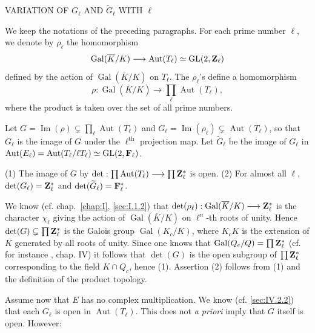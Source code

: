 %
  {VARIATION OF $G_\ell$ AND $\widetilde{G}_\ell$ WITH $\ell$}


We keep the notations of the preceding paragraphs. For each prime number $\ell$, we denote by $\rho_\ell$ the homomorphism
\[
  \operatorname{Gal}(\overline{K}/K) \longrightarrow \operatorname{Aut}(T_\ell) \simeq \mathrm{GL}(2,\mathbf{Z}_\ell)
\]
defined by the action of $\operatorname{Gal}(\overline{K}/K)$ on $T_\ell$. The $\rho_\ell$'s define a homomorphism
\[
  \rho : \operatorname{Gal}(\overline{K}/K) \longrightarrow \prod_{\ell} \operatorname{Aut}(T_\ell),
\]
where the product is taken over the set of all prime numbers.

Let $G = \operatorname{Im}(\rho) \subsetneq \prod_{\ell} \operatorname{Aut}(T_\ell)$ and $G_\ell = \operatorname{Im}(\rho_\ell) \subsetneq \operatorname{Aut}(T_\ell)$, so that $G_\ell$ is the image of $G$ under the $\ell^{\text{th}}$ projection map. Let $\widetilde{G}_\ell$ be the image of $G_\ell$ in $\operatorname{Aut}(E_\ell) = \operatorname{Aut}(T_\ell/\ell T_\ell) \simeq \mathrm{GL}(2,\mathbf{F}_\ell)$.

\begin{lemma}
(1) The image of $G$ by $\det : \prod \operatorname{Aut}(T_\ell) \longrightarrow \prod \mathbf{Z}_\ell^{*}$ is open.
(2) For almost all $\ell$, $\det(G_\ell) = \mathbf{Z}_\ell^{*}$ and $\det(\widetilde{G}_\ell) = \mathbf{F}_\ell^{*}$.
\end{lemma}

We know (cf. chap.~\ref{chap:I}, \ref{sec:I.1.2}) that $\det(\rho_\ell) : \operatorname{Gal}(\overline{K}/K) \longrightarrow \mathbf{Z}_\ell^{*}$ is the character $\chi_\ell$ giving the action of $\operatorname{Gal}(\overline{K}/K)$ on $\ell^n$-th roots of unity. Hence $\det(G) \subsetneq \prod \mathbf{Z}_\ell^{*}$ is the Galois group $\operatorname{Gal}(K_c/K)$, where $K_c K$ is the extension of $K$ generated by all roots of unity. Since one knows that $\operatorname{Gal}(Q_c/Q) = \prod \mathbf{Z}_\ell^{*}$ (cf. for instance \cite{lang-algnum}, chap. IV) it follows that $\det(G)$ is the open subgroup of $\prod \mathbf{Z}_\ell^{*}$ corresponding to the field $K \cap Q_c$, hence (1). Assertion (2) follows from (1) and the definition of the product topology.

Assume now that $E$ has no complex multiplication. We know (cf. \ref{sec:IV.2.2}) that each $G_\ell$ is open in $\operatorname{Aut}(T_\ell)$. This does not \emph{a priori} imply that $G$ itself is open. However:

